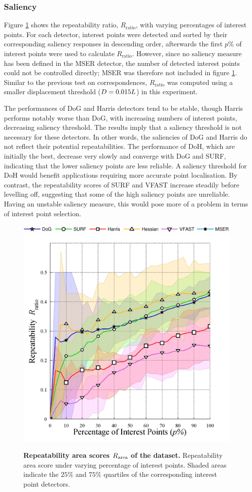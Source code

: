 \subsubsection{Saliency}

Figure \ref{fig/eval/graph_keypointnum} shows the repeatability ratio, $R_\textrm{ratio}$, with varying percentages of interest points. For each detector, interest points were detected and sorted by their corresponding saliency responses in descending order, afterwards the first $p\%$ of interest points were used to calculate $R_\mathrm{ratio}$. However, since no saliency measure has been defined in the MSER detector, the number of detected interest points could not be controlled directly; MSER was therefore not included in figure \ref{fig/eval/graph_keypointnum}. Similar to the previous test on correspondences, $R_\textrm{ratio}$ was computed using a smaller displacement threshold ($D = 0.015L$) in this experiment.   

The performances of DoG and Harris detectors tend to be stable, though Harris performs notably worse than DoG, with increasing numbers of interest points, \ie decreasing saliency threshold. The results imply that a saliency threshold is not necessary for these detectors. In other words, the saliencies of DoG and Harris do not reflect their potential repeatabilities. The performance of DoH, which are initially the best, decrease very slowly and converge with DoG and SURF, indicating that the lower saliency points are less reliable. A saliency threshold for DoH would benefit applications requiring more accurate point localisation. By contrast, the repeatability scores of SURF and VFAST increase steadily before levelling off, suggesting that some of the high saliency points are unreliable. Having an unstable saliency measure, this would pose more of a problem in terms of interest point selection. 

\begin{figure}[ht]
	\centering
	\includegraphics[width=0.70\linewidth]{./fig/eval/hlegend.jpg} \\ 
	\includegraphics[width=0.49\linewidth]{./fig/eval/graph_keypointnum.jpg}
	\caption{\textbf{Repeatability area scores $R_\textrm{area}$ of the \meshset dataset.} Repeatability area score under varying percentage of interest points. Shaded areas indicate the $25\%$ and $75\%$ quartiles of the corresponding interest point detectors.}
	\label{fig/eval/graph_keypointnum}	
\end{figure}

